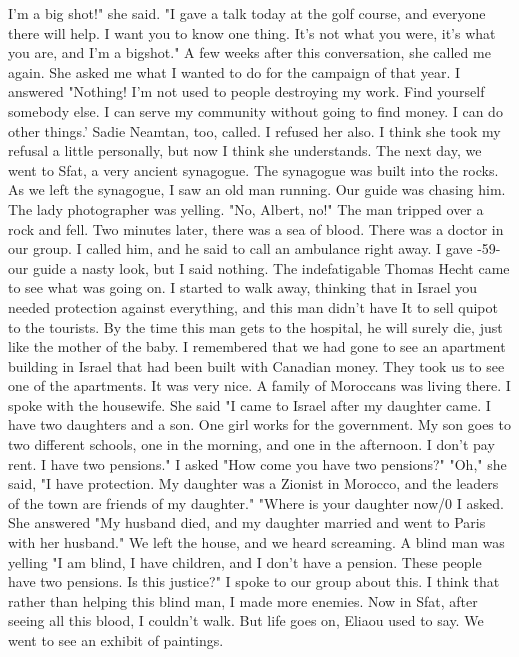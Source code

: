 I'm a big shot!"
she said.
"I gave a talk today at the golf course, and everyone there will 
help.
I want you to know one thing.
It's not what you were, it's what you 
are, and I'm a bigshot."
A few weeks after this conversation, she called me again.
She asked 
me what I wanted to do for the campaign of that year.
I answered "Nothing!
I'm not used to people destroying my work.
Find yourself somebody else.
I can serve my community without going to find money.
I can do other things.'
Sadie Neamtan, too, called.
I refused her also.
I think she took my refusal a little personally, but now I think she understands.
The next day, we went to Sfat, a very ancient synagogue.
The synagogue was built into the rocks.
As we left the synagogue, I saw an old 
man running.
Our guide was chasing him.
The lady photographer was yelling.
"No, Albert, no!"
The man tripped over a rock and fell.
Two minutes 
later, there was a sea of blood.
There was a doctor in our 
group.
I called him, and he said to call an ambulance right away.
I gave 
-59- 
our guide a nasty look, but I said nothing.
The indefatigable Thomas Hecht 
came to see what was going on.
I started to walk away, thinking that in 
Israel you needed protection against everything, and this man didn't have 
It to sell quipot to the tourists.
By the time this man gets to the 
hospital, he will surely die, just like the mother of the baby.
I remembered that we had gone to see an apartment building in Israel that had been 
built with Canadian money.
They took us to see one of the apartments.
It 
was very nice.
A family of Moroccans was living there.
I spoke with the 
housewife.
She said "I came to Israel after my daughter came.
I have two 
daughters and a son.
One girl works for the government.
My son goes to 
two different schools, one in the morning, and one in the afternoon.
I don't 
pay rent.
I have two pensions."
I asked "How come you have two pensions?"
"Oh," she said, "I have protection.
My daughter was a Zionist in Morocco, 
and the leaders of the town are friends of my daughter."
"Where is your 
daughter now/0 I asked.
She answered "My husband died, and my daughter 
married and went to Paris with her husband."
We left the house, and we 
heard screaming.
A blind man was yelling "I am blind, I have children, and 
I don't have a pension.
These people have two pensions.
Is this justice?"
I spoke to our group about this.
I think that rather than helping this 
blind man, I made more enemies.
Now in Sfat, after seeing all this blood, 
I couldn't walk.
But life goes on, Eliaou used to say.
We went to see an exhibit of paintings.
